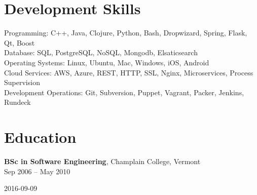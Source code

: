 \documentclass{article}
\newenvironment{bottompar}{\par\vspace*{\fill}}{\clearpage}
\begin{document}
\section*{Development Skills}
Programming: C++, Java, Clojure, Python, Bash, Dropwizard, Spring, Flask, Qt, Boost\\
Database: SQL, PostgreSQL, NoSQL, Mongodb, Elsaticsearch\\
Operating Systems: Linux, Ubuntu, Mac, Windows, iOS, Android\\
Cloud Services: AWS, Azure, REST, HTTP, SSL, Nginx, Microservices, Process Supervision\\
Development Operations: Git, Subversion, Puppet, Vagrant, Packer, Jenkins, Rundeck\\


\section*{Education}
{\bf BSc in Software Engineering}, Champlain College, Vermont\\
Sep 2006 -- May 2010


\begin{bottompar}
\begin{center}
{\small 2016-09-09}
\end{center}
\end{bottompar}
\end{document}
